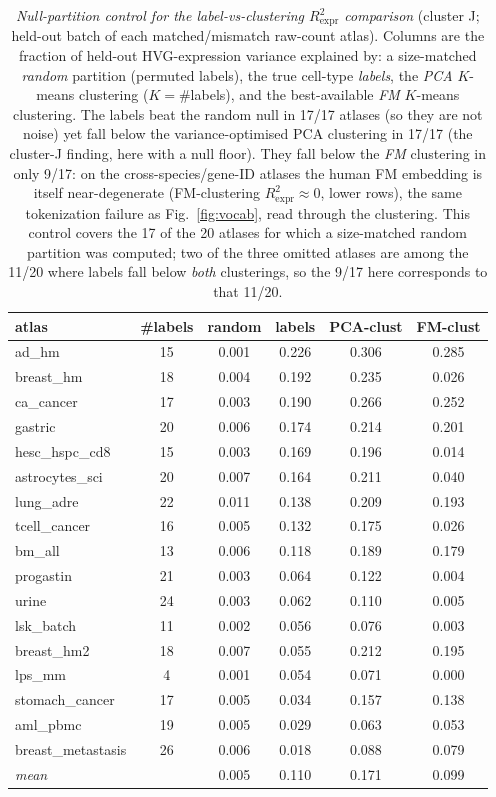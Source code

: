 \documentclass[11pt]{article}
\begin{document}
\begin{table}[htbp]\centering\footnotesize
\caption{\emph{Null-partition control for the label-vs-clustering $R^2_{\mathrm{expr}}$ comparison} (cluster J; held-out batch of each matched/mismatch raw-count atlas). Columns are the fraction of held-out HVG-expression variance explained by: a size-matched \emph{random} partition (permuted labels), the true cell-type \emph{labels}, the \emph{PCA} $K$-means clustering ($K{=}$\#labels), and the best-available \emph{FM} $K$-means clustering. The labels beat the random null in 17/17 atlases (so they are not noise) yet fall below the variance-optimised PCA clustering in 17/17 (the cluster-J finding, here with a null floor). They fall below the \emph{FM} clustering in only 9/17: on the cross-species/gene-ID atlases the human FM embedding is itself near-degenerate (FM-clustering $R^2_{\mathrm{expr}}\!\approx\!0$, lower rows), the same tokenization failure as Fig.~\ref{fig:vocab}, read through the clustering. This control covers the 17 of the 20 atlases for which a size-matched random partition was computed; two of the three omitted atlases are among the 11/20 where labels fall below \emph{both} clusterings, so the 9/17 here corresponds to that 11/20.}
\label{tab:nullctrl}
\begin{tabular}{@{}lccccc@{}}
\toprule
atlas & \#labels & random & labels & PCA-clust & FM-clust \\
\midrule
ad\_hm & 15 & 0.001 & 0.226 & 0.306 & 0.285 \\
breast\_hm & 18 & 0.004 & 0.192 & 0.235 & 0.026 \\
ca\_cancer & 17 & 0.003 & 0.190 & 0.266 & 0.252 \\
gastric & 20 & 0.006 & 0.174 & 0.214 & 0.201 \\
hesc\_hspc\_cd8 & 15 & 0.003 & 0.169 & 0.196 & 0.014 \\
astrocytes\_sci & 20 & 0.007 & 0.164 & 0.211 & 0.040 \\
lung\_adre & 22 & 0.011 & 0.138 & 0.209 & 0.193 \\
tcell\_cancer & 16 & 0.005 & 0.132 & 0.175 & 0.026 \\
bm\_all & 13 & 0.006 & 0.118 & 0.189 & 0.179 \\
progastin & 21 & 0.003 & 0.064 & 0.122 & 0.004 \\
urine & 24 & 0.003 & 0.062 & 0.110 & 0.005 \\
lsk\_batch & 11 & 0.002 & 0.056 & 0.076 & 0.003 \\
breast\_hm2 & 18 & 0.007 & 0.055 & 0.212 & 0.195 \\
lps\_mm & 4 & 0.001 & 0.054 & 0.071 & 0.000 \\
stomach\_cancer & 17 & 0.005 & 0.034 & 0.157 & 0.138 \\
aml\_pbmc & 19 & 0.005 & 0.029 & 0.063 & 0.053 \\
breast\_metastasis & 26 & 0.006 & 0.018 & 0.088 & 0.079 \\
\midrule
\emph{mean} & & 0.005 & 0.110 & 0.171 & 0.099 \\
\bottomrule
\end{tabular}
\end{table}

\FloatBarrier  %


\end{document}
